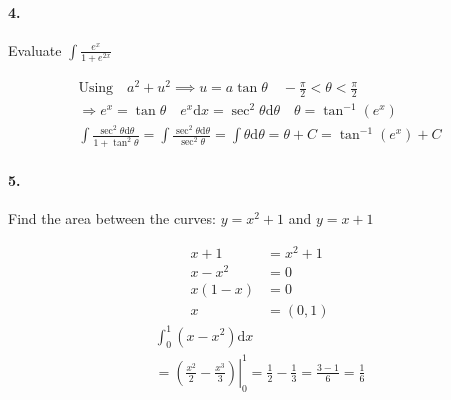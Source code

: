     \paragraph*{4.}
    Evaluate $\int\frac{e^x}{1+e^{2x}}$

    \begin{mdframed}
        \begin{equation*}
            \begin{gathered}
                \text{Using} \quad a^2 + u^2 \implies u = a\tan\theta \quad -\frac{\pi}{2} < \theta < \frac{\pi}{2}  \\
                \Rightarrow e^x = \tan\theta \quad e^x\mathrm{d}x = \sec^{2}\theta\mathrm{d}\theta \quad \theta = \tan^{-1}\left(e^x\right) \\
                \int\frac{\sec^2\theta\mathrm{d}\theta}{1+\tan^2\theta} = \int\frac{\sec^2\theta\mathrm{d}\theta}{\sec^2\theta} = \int\theta\mathrm{d}\theta = \theta + C = \boxed{\tan^{-1}\left(e^x\right) + C}
            \end{gathered}
        \end{equation*}
    \end{mdframed}

    \paragraph*{5.}
    Find the area between the curves: $y = x^2 + 1$ and $y = x + 1$

    \begin{mdframed}
        \begin{multicols*}{2}
            \begin{align*}
                x + 1   & = x^2 + 1   \\
                x - x^2 & = 0       \\
                x(1 - x)& = 0       \\
                      x & = (0, 1)
            \end{align*}
            \begin{equation*}
                \begin{gathered}
                    \int_{0}^{1}(x- x^2)\mathrm{d}x    \\
                    = \left.\left(\frac{x^2}{2}-\frac{x^3}{3}\right)\right|_{0}^{1} = \frac{1}{2}-\frac{1}{3} = \frac{3-1}{6} = \boxed{\frac{1}{6}}
                \end{gathered}
            \end{equation*}
        \end{multicols*}
    \end{mdframed}

